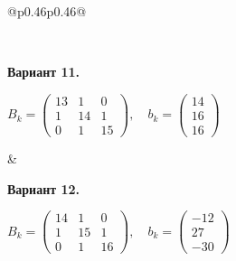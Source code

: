 \documentclass[12pt,a4paper]{article}
\begin{document}
{\begin{longtable}{@{}p{0.46\textwidth}p{0.46\textwidth}@{}}
\begin{minipage}[t]{\linewidth}
\end{minipage}\\\noalign{\vskip 14pt}
\begin{minipage}[t]{\linewidth}\vspace{0pt}\raggedright\setlength{\parskip}{0pt}
\textbf{Вариант 11.}\par\smallskip
\(\displaystyle B_k=\begin{pmatrix}13&1&0\\1&14&1\\0&1&15\end{pmatrix},\quad b_k=\begin{pmatrix}14\\16\\16\end{pmatrix}\)\par
\end{minipage} &
\begin{minipage}[t]{\linewidth}\vspace{0pt}\raggedright\setlength{\parskip}{0pt}
\textbf{Вариант 12.}\par\smallskip
\(\displaystyle B_k=\begin{pmatrix}14&1&0\\1&15&1\\0&1&16\end{pmatrix},\quad b_k=\begin{pmatrix}-12\\27\\-30\end{pmatrix}\)\par
\end{minipage}\\\noalign{\vskip 14pt}
\end{longtable}
}

\par\ifdim\dimexpr\pagegoal-\pagetotal\relax<140pt\relax\newpage\fi
\end{document}
